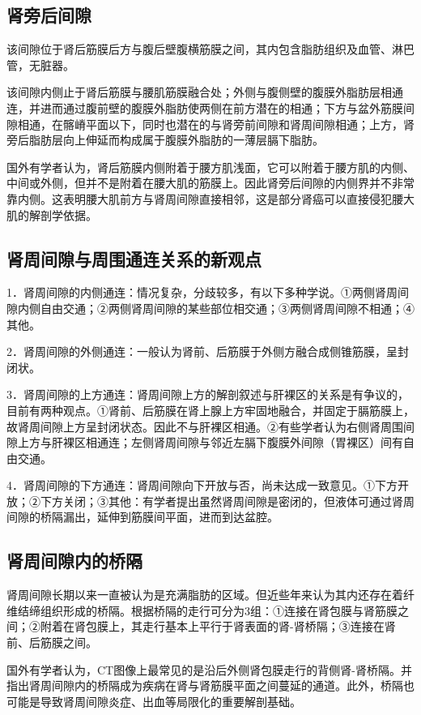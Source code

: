 \subsection{肾旁后间隙}

该间隙位于肾后筋膜后方与腹后壁腹横筋膜之间，其内包含脂肪组织及血管、淋巴管，无脏器。

该间隙内侧止于肾后筋膜与腰肌筋膜融合处；外侧与腹侧壁的腹膜外脂肪层相通连，并进而通过腹前壁的腹膜外脂肪使两侧在前方潜在的相通；下方与盆外筋膜间隙相通，在髂嵴平面以下，同时也潜在的与肾旁前间隙和肾周间隙相通；上方，肾旁后脂肪层向上伸延而构成属于腹膜外脂肪的一薄层膈下脂肪。

国外有学者认为，肾后筋膜内侧附着于腰方肌浅面，它可以附着于腰方肌的内侧、中间或外侧，但并不是附着在腰大肌的筋膜上。因此肾旁后间隙的内侧界并不非常靠内侧。这表明腰大肌前方与肾周间隙直接相邻，这是部分肾癌可以直接侵犯腰大肌的解剖学依据。

\subsection{肾周间隙与周围通连关系的新观点}

1．肾周间隙的内侧通连：情况复杂，分歧较多，有以下多种学说。①两侧肾周间隙内侧自由交通；②两侧肾周间隙的某些部位相交通；③两侧肾周间隙不相通；④其他。

2．肾周间隙的外侧通连：一般认为肾前、后筋膜于外侧方融合成侧锥筋膜，呈封闭状。

3．肾周间隙的上方通连：肾周间隙上方的解剖叙述与肝裸区的关系是有争议的，目前有两种观点。①肾前、后筋膜在肾上腺上方牢固地融合，并固定于膈筋膜上，故肾周间隙上方呈封闭状态。因此不与肝裸区相通。②有些学者认为右侧肾周围间隙上方与肝裸区相通连；左侧肾周间隙与邻近左膈下腹膜外间隙（胃裸区）间有自由交通。

4．肾周间隙的下方通连：肾周间隙向下开放与否，尚未达成一致意见。①下方开放；②下方关闭；③其他：有学者提出虽然肾周间隙是密闭的，但液体可通过肾周间隙的桥隔漏出，延伸到筋膜间平面，进而到达盆腔。

\subsection{肾周间隙内的桥隔}

肾周间隙长期以来一直被认为是充满脂肪的区域。但近些年来认为其内还存在着纤维结缔组织形成的桥隔。根据桥隔的走行可分为3组：①连接在肾包膜与肾筋膜之间；②附着在肾包膜上，其走行基本上平行于肾表面的肾-肾桥隔；③连接在肾前、后筋膜之间。

国外有学者认为，CT图像上最常见的是沿后外侧肾包膜走行的背侧肾-肾桥隔。并指出肾周间隙内的桥隔成为疾病在肾与肾筋膜平面之间蔓延的通道。此外，桥隔也可能是导致肾周间隙炎症、出血等局限化的重要解剖基础。

